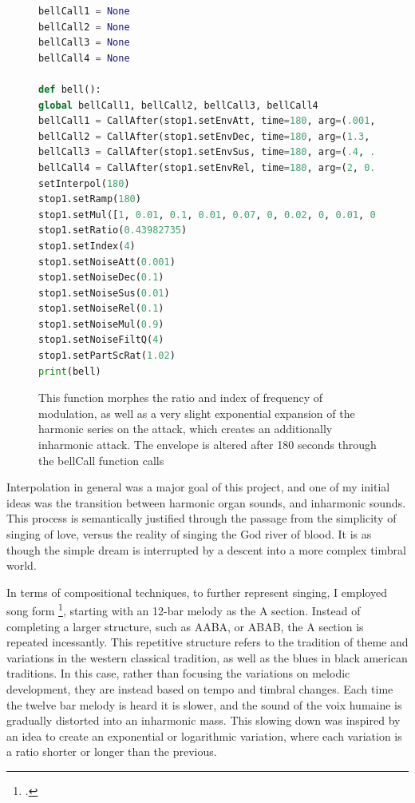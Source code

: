 \documentclass[12pt,twoside,maitrise]{dms_ks}
\theoremstyle{definition}
\begin{document}
\begin{figure}[H]  
\begin{lstlisting}[language=Python]  
bellCall1 = None  
bellCall2 = None  
bellCall3 = None  
bellCall4 = None

def bell():  
global bellCall1, bellCall2, bellCall3, bellCall4  
bellCall1 = CallAfter(stop1.setEnvAtt, time=180, arg=(.001, .001, .001, .001, 0.001, 0.001, 0.0001, 0.0006, 0.0007, 0.0005, 0.0006, 0.0003, 0.0005, 0.0003, 0.0006, 0.0005, 0.0004, 0.0002, 0.0001, 0.0001)).play()  
bellCall2 = CallAfter(stop1.setEnvDec, time=180, arg=(1.3, .05, .02, 0, 0, 0.04, .004, 0.04, .04, 0.04, .04, 0.04, .04, 0.04, .04, 0.04, .04, 0.04, .04, 0.04)).play()  
bellCall3 = CallAfter(stop1.setEnvSus, time=180, arg=(.4, .1, .02, .01, .01, 0.01, .01, 0.01, .01, 0.01, .01, 0.01, .01, 0.01, .01, 0.01, .01, 0.01, .002, 0.002)).play()  
bellCall4 = CallAfter(stop1.setEnvRel, time=180, arg=(2, 0.1, 0.1, .01, .03, 0.4, .04, 0.04, .04, 0.04, .04, 0.04, .04, 0.04, .04, 0.4, .04, 0.04, .04, 0.4)).play()  
setInterpol(180)  
stop1.setRamp(180)  
stop1.setMul([1, 0.01, 0.1, 0.01, 0.07, 0, 0.02, 0, 0.01, 0, 0.003, 0, 0.003, 0, 0.001, 0, 0.001, 0, 0.001, 0])  
stop1.setRatio(0.43982735)  
stop1.setIndex(4)  
stop1.setNoiseAtt(0.001)  
stop1.setNoiseDec(0.1)  
stop1.setNoiseSus(0.01)  
stop1.setNoiseRel(0.1)  
stop1.setNoiseMul(0.9)  
stop1.setNoiseFiltQ(4)  
stop1.setPartScRat(1.02)  
print(bell)  
\end{lstlisting}  
\caption{This function morphes the ratio and index of frequency of modulation, as well as a very slight exponential expansion of the harmonic series on the attack, which creates an additionally inharmonic attack. The envelope is altered after 180 seconds through the bellCall function calls}  
\end{figure}

Interpolation in general was a major goal of this project, and one of my initial ideas was the transition between harmonic organ sounds, and inharmonic sounds.  
This process is semantically justified through the passage from the simplicity of singing of love, versus the reality of singing the God river of blood.  
It is as though the simple dream is interrupted by a descent into a more complex timbral world.

In terms of compositional techniques, to further represent singing, I employed song form \footcite{owens_forms_2003}, starting with an 12-bar melody as the A section.
Instead of completing a larger structure, such as AABA, or ABAB, the A section is repeated incessantly.
This repetitive structure refers to the tradition of theme and variations in the western classical tradition, as well as the blues in black american traditions.  
In this case, rather than focusing the variations on melodic development, they are instead based on tempo and timbral changes. 
Each time the twelve bar melody is heard it is slower, and the sound of the voix humaine is gradually distorted into an inharmonic mass.
This slowing down was inspired by an idea to create an exponential or logarithmic variation, where each variation is a ratio shorter or longer than the previous.
\end{document}
